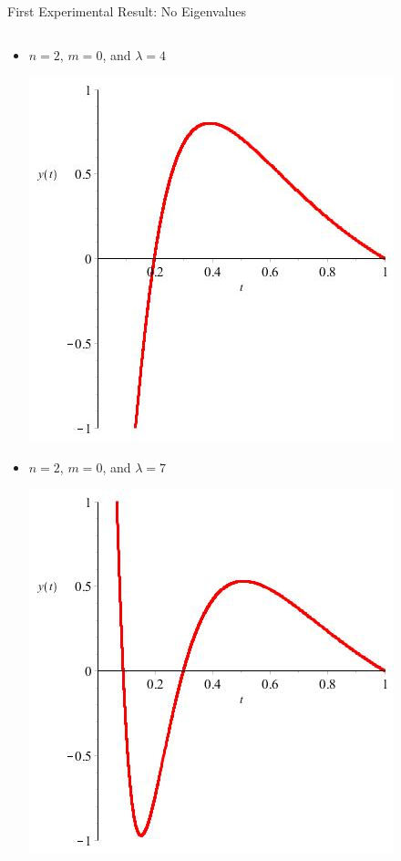 \documentclass{beamer}
\begin{document}
\begin{frame}{First Experimental Result: No Eigenvalues}

\begin{columns}[T]

\hspace*{5mm}

\begin{column}{35mm}

\begin{itemize}

\item $n=2$, $m=0$, and $\lambda=4$

\includegraphics[scale=0.15]{NEquals2MEquals0LambdaEquals4}

\end{itemize}

\begin{itemize}

\item $n=2$, $m=0$, and $\lambda=7$

\includegraphics[scale=0.15]{NEquals2MEquals0LambdaEquals7}


\end{itemize}
\end{column}
\end{columns}
\end{frame}
\end{document}
